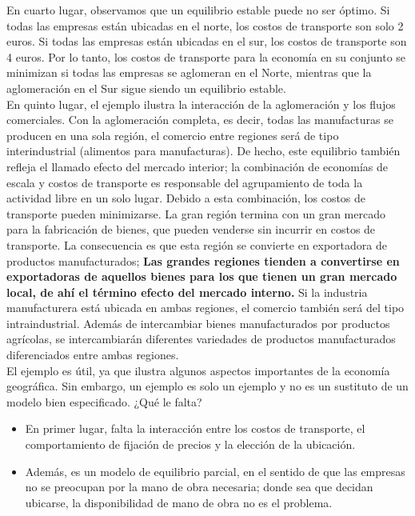 En cuarto lugar, observamos que un equilibrio estable puede no ser óptimo. Si todas las empresas están ubicadas en el norte, los costos de transporte son solo 2 euros. Si todas las empresas están ubicadas en el sur, los costos de transporte son 4 euros. Por lo tanto, los costos de transporte para la economía en su conjunto se minimizan si todas las empresas se aglomeran en el Norte, mientras que la aglomeración en el Sur sigue siendo un equilibrio estable.\\
En quinto lugar, el ejemplo ilustra la interacción de la aglomeración y los flujos comerciales. Con la aglomeración completa, es decir, todas las manufacturas se producen en una sola región, el comercio entre regiones será de tipo interindustrial (alimentos para manufacturas). De hecho, este equilibrio también refleja el llamado efecto del mercado interior; la combinación de economías de escala y costos de transporte es responsable del agrupamiento de toda la actividad libre en un solo lugar. Debido a esta combinación, los costos de transporte pueden minimizarse. La gran región termina con un gran mercado para la fabricación de bienes, que pueden venderse sin incurrir en costos de transporte. La consecuencia es que esta región se convierte en exportadora de productos manufacturados; \textbf{Las grandes regiones tienden a convertirse en exportadoras de aquellos bienes para los que tienen un gran mercado local, de ahí el término efecto del mercado interno.} Si la industria manufacturera está ubicada en ambas regiones, el comercio también será del tipo intraindustrial. Además de intercambiar bienes manufacturados por productos agrícolas, se intercambiarán diferentes variedades de productos manufacturados diferenciados entre ambas regiones.\\
El ejemplo es útil, ya que ilustra algunos aspectos importantes de la economía geográfica. Sin embargo, un ejemplo es solo un ejemplo y no es un sustituto de un modelo bien especificado. ¿Qué le falta?
\begin{itemize}
    \item En primer lugar, falta la interacción entre los costos de transporte, el comportamiento de fijación de precios y la elección de la ubicación. 
    \item Además, es un modelo de equilibrio parcial, en el sentido de que las empresas no se preocupan por la mano de obra necesaria; donde sea que decidan ubicarse, la disponibilidad de mano de obra no es el problema. 
\end{itemize}


